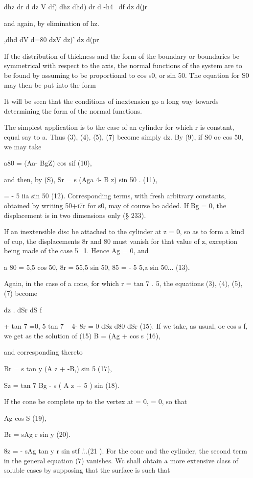 dhz dr d dz V df) dhz dhd) dr d -h4 ~df  dz d(jr

and again, by elimination of hz.

,dhd dV d=80 dzV dz)' dz d(pr

If the distribution of thickness and the form of the boundary or boundaries be
symmetrical with respect to the axis, the normal functions of the system are
to be found by assuming to be proportional to cos s0, or sin 50. The equation
for S0 may then be put into the form

It will be seen that the conditions of inextension go a long way towards
determining the form of the normal functions.

The simplest application is to the case of an cylinder for which r is constant,
equal say to a. Thus (3), (4), (5), (7) become simply dz. By (9), if S0 oc cos
50, we may take

a80 = (Aa- BgZ) cos sif (10),

and then, by (S), Sr = s (Aga 4- B z) sin 50 . (11),

= - 5 iia sin 50 (12).  Corresponding terms, with fresh arbitrary constants,
obtained by writing 50+i7r for s0, may of course bo added. If Bg = 0, the
displacement is in two dimensions only (§ 233).

If an inextensible disc be attached to the cylinder at z = 0, so as to form a
kind of cup, the displacements 8r and 80 must vanish for that value of z,
exception being made of the case 5=1. Hence Ag = 0, and

a 80 = 5,5 cos 50, 8r = 55,5 sin 50, 85 = - 5 5,a sin 50... (13).

Again, in the case of a cone, for which r = tan 7 . 5, the equations (3), (4),
(5), (7) become

dz . dSr  dS f

+ tan 7 =0, 5 tan 7 ~ 4- 8r = 0 dSz d80 dSr (15).  If we take, as usual, oc cos
s f, we get as the solution of (15) B = (Ag + cos s (16),

and corresponding thereto

Br = s tan y (A z + -B,) sin 5 (17),

Sz = tan 7 Bg - s ( A z + 5 ) sin (18).

If the cone be complete up to the vertex at = 0, = 0, so that

Ag cos S (19),

Br = sAg r sin y (20).

8z = - sAg tan y r sin stf .'..(21 ).  For the cone and the cylinder, the
second term in the general equation (7) vanishes. Wc shall obtain a more
extensive class of soluble cases by supposing that the surface is such that

